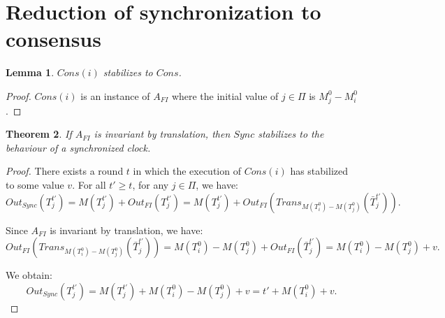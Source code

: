 \documentclass[11pt,letterpaper]{article}
\newtheorem{thm}{Theorem}
\newtheorem{lem}[thm]{Lemma}
\begin{document}
\section{Reduction of synchronization to consensus}

\begin{lem}
	$Cons(i)$ stabilizes to $Cons$.
\end{lem}
\begin{proof}
	$Cons(i)$ is an instance of $A_{FI}$ where the initial value of $j \in \Pi$ is $M_j^0-M_i^0$.
\end{proof}
\begin{thm}
	If $A_{FI}$ is invariant by translation, then $Sync$ stabilizes to the behaviour of a synchronized clock.
\end{thm}
\begin{proof}
	There exists a round $t$ in which the execution of $Cons(i)$ has stabilized to some value $v$.
	For all $t' \geq t$, for any $j \in \Pi$, we have:
	$$Out_{Sync}(T_j^{t'}) = M(T_j^{t'}) + Out_{FI}(T_j^{t'}) = M(T_j^{t'}) + Out_{FI}(Trans_{M(T_i^0)-M(T_j^0)}(\bar T_j^{t'})).$$

	\noindent Since $A_{FI}$ is invariant by translation, we have:
	$$Out_{FI}(Trans_{M(T_i^0)-M(T_j^0)}(\bar T_j^{t'})) = M(T_i^0)-M(T_j^0) + Out_{FI}(\bar T_j^{t'}) = M(T_i^0)-M(T_j^0) + v.$$

	\noindent We obtain:
	$$Out_{Sync}(T_j^{t'}) = M(T_j^{t'}) + M(T_i^0)-M(T_j^0) + v = t' + M(T_i^0) + v.$$
\end{proof}
\end{document}
